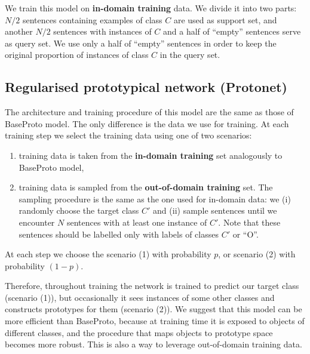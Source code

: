 We train this model on \textbf{in-domain training} data. We divide it into two parts: $N/2$ sentences containing examples of class $C$ are used as support set, and another $N/2$ sentences with instances of $C$ and a half of ``empty'' sentences serve as query set. We use only a half of ``empty'' sentences in order to keep the original proportion of instances of class $C$ in the query set.



\subsection{Regularised prototypical network (Protonet)}
\label{section:protonet}
 
The architecture and training procedure of this model are the same as those of BaseProto model. The only difference is the data we use for training. At each training step we select the training data using one of two scenarios:

\begin{enumerate}
	\item training data is taken from the \textbf{in-domain training} set analogously to BaseProto model,
    \item training data is sampled from the \textbf{out-of-domain training} set. The sampling procedure is the same as the one used for in-domain data: we (i) randomly choose the target class $C'$ and (ii) sample sentences until we encounter $N$ sentences with at least one instance of $C'$. Note that these sentences should be labelled only with labels of classes $C'$ or ``O''.
\end{enumerate}

At each step we choose the scenario (1) with probability $p$, or scenario (2) with probability $(1-p)$.

Therefore, throughout training the network is trained to predict our target class (scenario (1)), but occasionally it sees instances of some other classes and constructs prototypes for them (scenario (2)). We suggest that this model can be more efficient than BaseProto, because at training time it is exposed to objects of different classes, and the procedure that maps objects to prototype space becomes more robust. This is also a way to leverage out-of-domain training data.

